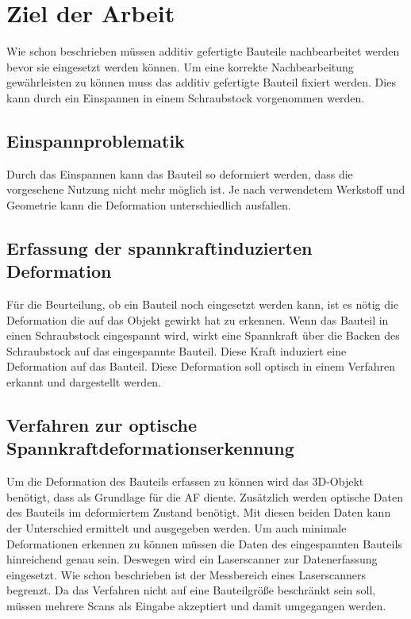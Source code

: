 \documentclass[../main.tex]{subfiles}
\begin{document}
\section{Ziel der Arbeit}

Wie schon beschrieben müssen additiv gefertigte Bauteile nachbearbeitet werden
bevor sie eingesetzt werden können. 
Um eine korrekte Nachbearbeitung gewährleisten zu können muss das additiv 
gefertigte Bauteil fixiert werden. Dies kann durch ein Einspannen in einem 
Schraubstock vorgenommen werden. 

\subsection{Einspannproblematik}

Durch das Einspannen kann das Bauteil so deformiert werden, dass die vorgesehene Nutzung nicht mehr möglich ist. 
Je nach verwendetem Werkstoff und Geometrie kann die Deformation unterschiedlich
ausfallen. 

\subsection{Erfassung der spannkraftinduzierten Deformation}

Für die Beurteilung, ob ein Bauteil noch eingesetzt werden kann, ist es nötig die 
Deformation die auf das Objekt gewirkt hat zu erkennen. Wenn das Bauteil in einen 
Schraubstock eingespannt wird, wirkt eine Spannkraft über die Backen des Schraubstock
auf das eingespannte Bauteil. 
Diese Kraft induziert eine Deformation auf das Bauteil. Diese Deformation soll 
optisch in einem Verfahren erkannt und dargestellt werden.

\subsection{Verfahren zur optische Spannkraftdeformationserkennung}

Um die Deformation des Bauteils erfassen zu können wird das 3D-Objekt benötigt, 
dass als Grundlage für die AF diente. Zusätzlich werden optische Daten des Bauteils 
im deformiertem Zustand benötigt. Mit diesen beiden Daten kann der Unterschied 
ermittelt und ausgegeben werden.
Um auch minimale Deformationen erkennen zu können müssen die Daten des 
eingespannten Bauteils hinreichend genau sein. Deswegen wird ein Laserscanner zur 
Datenerfassung eingesetzt.
Wie schon beschrieben ist der Messbereich eines Laserscanners begrenzt. Da das 
Verfahren nicht auf eine Bauteilgröße beschränkt sein soll, müssen mehrere Scans als 
Eingabe akzeptiert und damit umgegangen werden.
\end{document}
